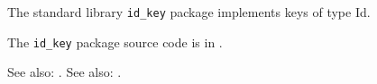 
The standard library {\tt id\_key} package implements keys of type Id.

The {\tt id\_key} package source code is in .

See also:  .
See also:  .


